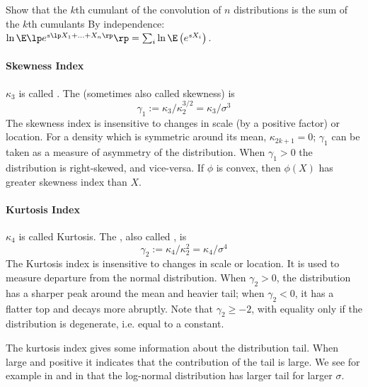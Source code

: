  {Show that the $k$th cumulant of
the convolution of $n$ distributions is the sum
of the $k$th cumulants}
 {By independence: $\ln \E\lp e^{s \lp X_1 +...+X_n\rp }\rp= \sum_i
  \ln\E\left(e^{s X_i }\right)$.}
\paragraph{Skewness Index}
$\kappa_3$ is called . The
 (sometimes also called
skewness) is
$$\gamma_1:=\kappa_3/\kappa_2^{3/2}=\kappa_3/\sigma^3$$
 The skewness index is
insensitive to changes in scale (by a positive
factor) or location. For a density which is
symmetric around its mean, $\kappa_{2k+1}=0$;
$\gamma_1$ can be taken as a measure of asymmetry
of the distribution. When $\gamma_1 >0$ the
distribution is right-skewed, and vice-versa. If
$\phi$ is convex, then $\phi(X)$ has greater
skewness index than $X$.

\paragraph{Kurtosis Index}
$\kappa_4$ is called Kurtosis. The , also called , is
$$\gamma_2:=\kappa_4/\kappa_2^{2}=\kappa_4/\sigma^4$$
 The Kurtosis index is
insensitive to changes in scale or location. It
is used to measure departure from the normal
distribution. When $\gamma_2 >0$, the
distribution has a sharper peak around the mean
and heavier tail; when $\gamma_2 <0$, it has a
flatter top and decays more abruptly. Note that
$\gamma_2 \geq -2$, with equality only if the
distribution is degenerate, i.e. equal to a
constant.

The kurtosis index gives some information about the
distribution tail. When large and positive it indicates that
the contribution of the tail is large. We see for example in
 and in  that the
log-normal distribution has larger tail for larger $\sigma$.

